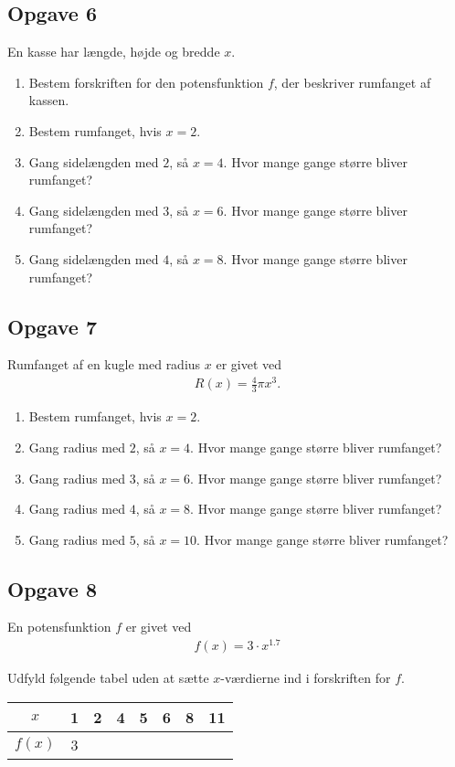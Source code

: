 \subsection*{Opgave 6}
En kasse har længde, højde og bredde $x$. 
\begin{enumerate}[label=\roman*)]
	\item Bestem forskriften for den potensfunktion $f$, der beskriver rumfanget af kassen.
	\item Bestem rumfanget, hvis $x = 2$.
	\item Gang sidelængden med $2$, så $x = 4$. Hvor mange gange større bliver rumfanget?
	\item Gang sidelængden med $3$, så $x = 6$. Hvor mange gange større bliver rumfanget?
	\item Gang sidelængden med $4$, så $x = 8$. Hvor mange gange større bliver rumfanget?
\end{enumerate}



\subsection*{Opgave 7}
Rumfanget af en kugle med radius $x$ er givet ved
\begin{align*}
	R(x) = \frac{4}{3}\pi x^3.
\end{align*}
\begin{enumerate}[label = \roman*)]
	\item Bestem rumfanget, hvis $x = 2$.
	\item Gang radius med $2$, så $x = 4$. Hvor mange gange større bliver rumfanget?
	\item Gang radius med $3$, så $x = 6$. Hvor mange gange større bliver rumfanget?
	\item Gang radius med $4$, så $x = 8$. Hvor mange gange større bliver rumfanget?
	\item Gang radius med $5$, så $x = 10$. Hvor mange gange større bliver rumfanget?
\end{enumerate}

\subsection*{Opgave 8}
En potensfunktion $f$ er givet ved
\begin{align*}
	f(x) = 3 \cdot x^{1.7}
\end{align*}

Udfyld følgende tabel uden at sætte $x$-værdierne ind i forskriften for $f$.
\begin{center}
	\begin{tabular}{c|c|c|c|c|c|c|c}
		$x$ & 1 & 2 & 4 & 5 & 6 & 8 & 11 \\ \hline
		$f(x)$ & 3 & & & & & &
	\end{tabular}
\end{center}

